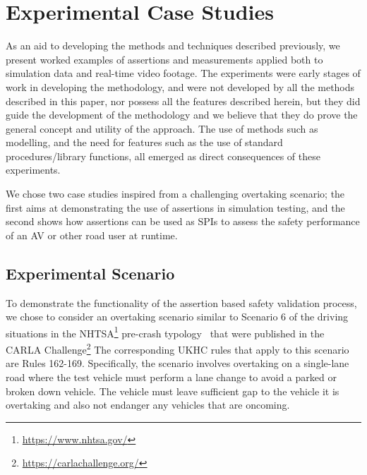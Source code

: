 \section{Experimental Case Studies} \label{Experimental_scenario}
As an aid to developing the methods and techniques described previously, we present worked examples of assertions and measurements applied both to simulation data and real-time video footage. The experiments were early stages of work in developing the methodology, and were not developed by all the methods described in this paper, nor possess all the features described herein, but they did guide the development of the methodology and we believe that they do prove the general concept and utility of the approach. The use of methods such as modelling, and the need for features such as the use of standard procedures/library functions, all emerged as direct consequences of these experiments.

We chose two case studies inspired from a challenging overtaking scenario; the first aims at demonstrating the use of assertions in simulation testing, and the second shows how assertions can be used as SPIs to assess the safety performance of an AV or other road user at runtime.

\subsection{Experimental Scenario} %
\label{carla_challenge}
To demonstrate the functionality of the assertion based safety validation process, we chose to consider an overtaking scenario similar to Scenario 6 of the driving situations in the NHTSA\footnote{\url{https://www.nhtsa.gov/}} pre-crash typology~\cite{nhtsa_precrash} that were published in the CARLA Challenge\footnote{\url{https://carlachallenge.org/}} The corresponding UKHC rules \cite{highwayCode} that apply to this scenario are Rules 162-169. Specifically, the scenario involves overtaking on a single-lane road where the test vehicle must perform a lane change to avoid a parked or broken down vehicle. 
The vehicle must leave sufficient gap to the vehicle it is overtaking and also not endanger any vehicles that are oncoming.


